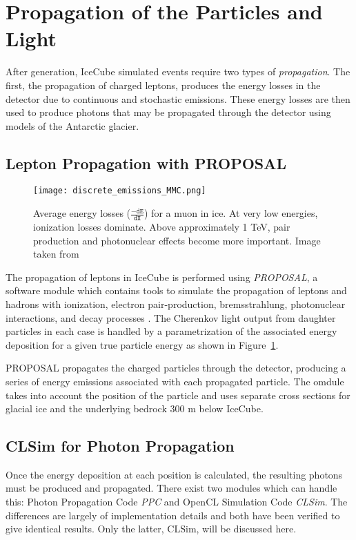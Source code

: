 \section{Propagation of the Particles and Light}
After generation, IceCube simulated events require two types of \emph{propagation}.
The first, the propagation of charged leptons, produces the energy losses in the detector due to continuous and stochastic emissions.
These energy losses are then used to produce photons that may be propagated through the detector using models of the Antarctic glacier.

\label{sec:propagation}

\subsection{Lepton Propagation with PROPOSAL}
\label{subsec:proposal}

\begin{figure}
\centering
\texttt{[image: discrete\_emissions\_MMC.png]}
\caption{Average energy losses ($\mathtt{\frac{-dE}{dX}}$) for a muon in ice. At very low energies, ionization losses dominate. Above approximately 1 TeV, pair production and photonuclear effects become more important. Image taken from \cite{Dima-MMC}}
\label{fig:discrete_emissions}
\end{figure}

The propagation of leptons in IceCube is performed using \emph{PROPOSAL}, a software module which contains tools to simulate the propagation of leptons and hadrons with ionization, electron pair-production, bremsstrahlung, photonuclear interactions, and decay processes \cite{PROPOSAL}.
The Cherenkov light output from daughter particles in each case is handled by a parametrization of the associated energy deposition for a given true particle energy as shown in Figure~\ref{fig:discrete_emissions}.

PROPOSAL propagates the charged particles through the detector, producing a series of energy emissions associated with each propagated particle.
The omdule takes into account the position of the particle and uses separate cross sections for glacial ice and the underlying bedrock 300 m below IceCube.

\subsection{CLSim for Photon Propagation}
\label{subsec:clsim}
Once the energy deposition at each position is calculated, the resulting photons must be produced and propagated. 
There exist two modules which can handle this: Photon Propagation Code \emph{PPC} and OpenCL Simulation Code \emph{CLSim}. 
The differences are largely of implementation details and both have been verified to give identical results.
Only the latter, CLSim, will be discussed here.

